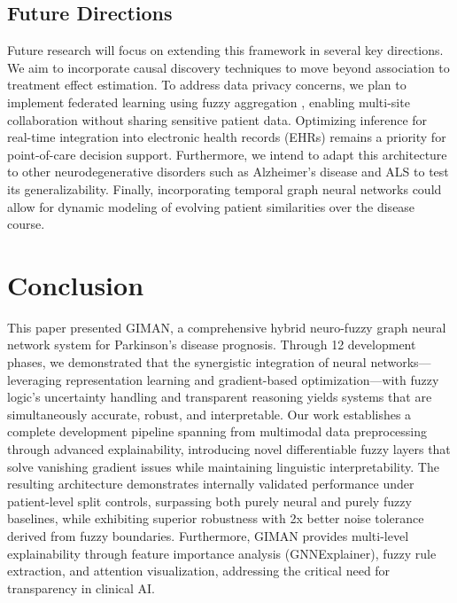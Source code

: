 \documentclass[journal,twoside,web]{ieeecolor}
\begin{document}
\subsection{Future Directions}

Future research will focus on extending this framework in several key directions. We aim to incorporate causal discovery techniques \cite{peters2017elements} to move beyond association to treatment effect estimation. To address data privacy concerns, we plan to implement federated learning using fuzzy aggregation \cite{kairouz2019advances}, enabling multi-site collaboration without sharing sensitive patient data. Optimizing inference for real-time integration into electronic health records (EHRs) remains a priority for point-of-care decision support. Furthermore, we intend to adapt this architecture to other neurodegenerative disorders such as Alzheimer's disease and ALS to test its generalizability. Finally, incorporating temporal graph neural networks \cite{kazemi2020representation} could allow for dynamic modeling of evolving patient similarities over the disease course.

\section{Conclusion}

This paper presented GIMAN, a comprehensive hybrid neuro-fuzzy graph neural network system for Parkinson's disease prognosis. Through 12 development phases, we demonstrated that the synergistic integration of neural networks---leveraging representation learning and gradient-based optimization---with fuzzy logic's uncertainty handling and transparent reasoning yields systems that are simultaneously accurate, robust, and interpretable. Our work establishes a complete development pipeline spanning from multimodal data preprocessing through advanced explainability, introducing novel differentiable fuzzy layers that solve vanishing gradient issues while maintaining linguistic interpretability. The resulting architecture demonstrates internally validated performance under patient-level split controls, surpassing both purely neural and purely fuzzy baselines, while exhibiting superior robustness with 2x better noise tolerance derived from fuzzy boundaries. Furthermore, GIMAN provides multi-level explainability through feature importance analysis (GNNExplainer), fuzzy rule extraction, and attention visualization, addressing the critical need for transparency in clinical AI.
\end{document}
